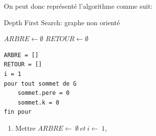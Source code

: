 On peut donc représenté l'algorithme comme suit:

\begin{algorithm}
\caption{Depth First Search: graphe non orienté}
\begin{algorithmic}
\State $ARBRE \gets \emptyset$
\State $RETOUR \gets \emptyset$



\end{algorithmic}
\end{algorithm}

\begin{verbatim}
ARBRE = []
RETOUR = []
i = 1
pour tout sommet de G
	sommet.pere = 0
	sommet.k = 0
fin pour

\end{verbatim}
\begin{enumerate}
	\item Mettre  $ARBRE \longleftarrow\ \emptyset\ et\ i\longleftarrow\ 1$, 
\end{enumerate}


 
 